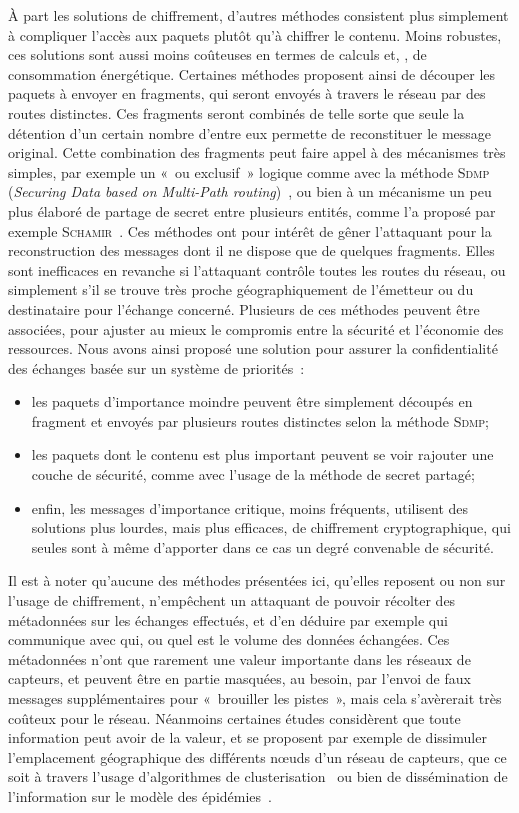 À part les solutions de chiffrement, d'autres méthodes consistent plus simplement à compliquer l'accès aux paquets plutôt qu'à chiffrer le contenu.
Moins robustes, ces solutions sont aussi moins coûteuses en termes de calculs et, \infine, de consommation énergétique.
Certaines méthodes proposent ainsi de découper les paquets à envoyer en fragments, qui seront envoyés à travers le réseau par des routes distinctes.
Ces fragments seront combinés de telle sorte que seule la détention d'un certain nombre d'entre eux permette de reconstituer le message original.
Cette combination des fragments peut faire appel à des mécanismes très simples, par exemple un « ou exclusif » logique comme avec la méthode \textsc{Sdmp} (\textit{Securing Data based on Multi-Path routing})~\cite{BM10}, ou bien à un mécanisme un peu plus élaboré de partage de secret entre plusieurs entités, comme l'a proposé par exemple \textsc{Schamir}~\cite{Sha79}.
Ces méthodes ont pour intérêt de gêner l'attaquant pour la reconstruction des messages dont il ne dispose que de quelques fragments.
Elles sont inefficaces en revanche si l'attaquant contrôle toutes les routes du réseau, ou simplement s'il se trouve très proche géographiquement de l'émetteur ou du destinataire pour l'échange concerné.
Plusieurs de ces méthodes peuvent être associées, pour ajuster au mieux le compromis entre la sécurité et l'économie des ressources.
Nous avons ainsi proposé une solution pour assurer la confidentialité des échanges basée sur un système de priorités~\cite{MMB13}:
\begin{itemize}
    \item les paquets d'importance moindre peuvent être simplement découpés en fragment et envoyés par plusieurs routes distinctes selon la méthode \textsc{Sdmp};
    \item les paquets dont le contenu est plus important peuvent se voir rajouter une couche de sécurité, comme avec l'usage de la méthode de secret partagé;
    \item enfin, les messages d'importance critique, moins fréquents, utilisent des solutions plus lourdes, mais plus efficaces, de chiffrement cryptographique, qui seules sont à même d'apporter dans ce cas un degré convenable de sécurité.
\end{itemize}

Il est à noter qu'aucune des méthodes présentées ici, qu'elles reposent ou non sur l'usage de chiffrement, n'empêchent un attaquant de pouvoir récolter des métadonnées sur les échanges effectués, et d'en déduire par exemple qui communique avec qui, ou quel est le volume des données échangées.
Ces métadonnées n'ont que rarement une valeur importante dans les réseaux de capteurs, et peuvent être en partie masquées, au besoin, par l'envoi de faux messages supplémentaires pour « brouiller les pistes », mais cela s'avèrerait très coûteux pour le réseau.
Néanmoins certaines études considèrent que toute information peut avoir de la valeur, et se proposent par exemple de dissimuler l'emplacement géographique des différents nœuds d'un réseau de capteurs, que ce soit à travers l'usage d'algorithmes de clusterisation~\cite{GK13} ou bien de dissémination de l'information sur le modèle des épidémies~\cite{KDA14}.

